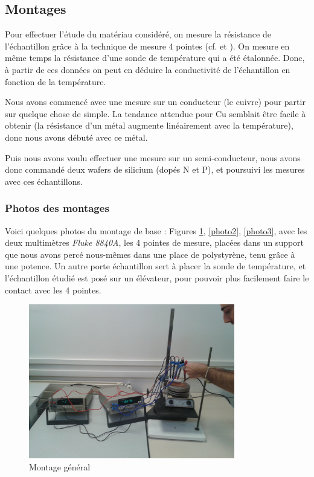 \subsection{Montages}
Pour effectuer l'étude du matériau considéré, on mesure la résistance de l'échantillon grâce à la technique de mesure 4 pointes (cf. \cite{smits_measurement_1958} et \cite{philipsgloeilampenfabrieken_method_1958}).
On mesure en même temps la résistance d'une sonde de température qui a été étalonnée.
Donc, à partir de ces données on peut en déduire la conductivité de l'échantillon en fonction de la température.

Nous avons commencé avec une mesure sur un conducteur (le cuivre) pour partir sur quelque chose de simple.
La tendance attendue pour Cu semblait être facile à obtenir (la résistance d'un métal augmente linéairement avec la température), donc nous avons débuté avec ce métal.

Puis nous avons voulu effectuer une mesure sur un semi-conducteur, nous avons donc commandé deux wafers de silicium (dopés N et P), et poursuivi les mesures avec ces échantillons.

\subsubsection{Photos des montages}

Voici quelques photos du montage de base : Figures \ref{photo1}, \ref{photo2}, \ref{photo3}, avec les deux multimètres \emph{Fluke 8840A}, les 4 pointes de mesure, placées dans un support que nous avons percé nous-mêmes dans une place de polystyrène, tenu grâce à une potence. Un autre porte échantillon sert à placer la sonde de température, et l'échantillon étudié est posé sur un élévateur, pour pouvoir plus facilement faire le contact avec les 4 pointes.

\begin{figure}[!b]
  \begin{center}
		\includegraphics[width=9cm]{./images/photo1.jpg}
		\caption{Montage général}
		\label{photo1}
	\end{center}
\end{figure}

